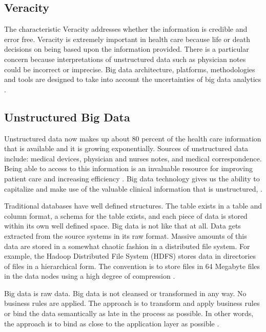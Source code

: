 \documentclass[sigconf]{acmart}
\begin{document}
\subsection{Veracity}

The characteristic Veracity addresses whether the information is credible and error free. Veracity is extremely important in health care because life or death decisions on being based upon the information provided. There is a particular concern because interpretations of unstructured data such as physician notes could be incorrect or imprecise. Big data architecture, platforms, methodologies and tools are designed to take into account the uncertainties of big data analytics \cite{springer}. 

\subsection{Unstructured Big Data}
Unstructured data now makes up about 80 percent of the health care information that is available and it is growing exponentially.  Sources of unstructured data include: medical devices, physician and nurses notes, and medical correspondence.  Being able to access to this information is an invaluable resource for improving patient care and increasing efficiency \cite{www-google-McDonald}.  Big data technology gives us the ability to capitalize and make use of the valuable clinical information that is unstructured, \cite{www-google-HlthCat}. 

Traditional databases have well defined structures. The table exists in a table and column format, a schema for the table exists, and each piece of data is stored within its own well defined space.  Big data is not like that at all.  Data gets extracted from the source systems in its raw format.  Massive amounts of this data are stored in a somewhat chaotic fashion in a distributed file system.  For example, the Hadoop Distributed File System (HDFS) stores data in directories of files in a hierarchical form. The convention is to store files in 64 Megabyte files in the data nodes using a high degree of compression \cite{www-google-HlthCat}. 

Big data is raw data. Big data is not cleansed or transformed in any way. No business rules are applied. The approach is to transform and apply business rules or bind the data semantically as late in the process as possible.  In other words, the approach is to bind as close to the application layer as possible \cite{www-google-HlthCat}.
\end{document}

